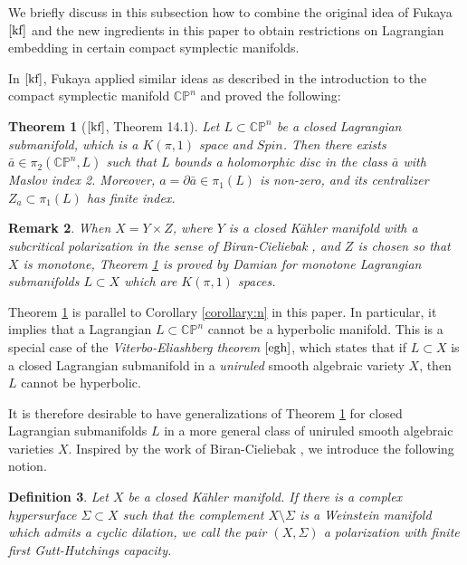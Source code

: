 \documentclass[a4paper]{article}
\newtheorem{theorem}{Theorem}
\newtheorem{definition}[theorem]{Definition}
\newtheorem{remark}[theorem]{Remark}
\numberwithin{equation}{section}
\begin{document}
We briefly discuss in this subsection how to combine the original idea of Fukaya $\cite{kf}$ and the new ingredients in this paper to obtain restrictions on Lagrangian embedding in certain compact symplectic manifolds.

In $\cite{kf}$, Fukaya applied similar ideas as described in the introduction to the compact symplectic manifold $\mathbb{CP}^n$ and proved the following:

\begin{theorem}[$\cite{kf}$, Theorem 14.1]\label{theorem:compact}
Let $L\subset\mathbb{CP}^n$ be a closed Lagrangian submanifold, which is a $K(\pi,1)$ space and $\mathit{Spin}$. Then there exists $\bar{a}\in\pi_2(\mathbb{CP}^n,L)$ such that $L$ bounds a holomorphic disc in the class $\bar{a}$ with Maslov index 2. Moreover, $a=\partial\bar{a}\in\pi_1(L)$ is non-zero, and its centralizer $Z_a\subset\pi_1(L)$ has finite index.
\end{theorem}

\begin{remark}\label{remark:Damian}
When $X=Y\times Z$, where $Y$ is a closed K\"{a}hler manifold with a subcritical polarization in the sense of Biran-Cieliebak \cite{bc}, and $Z$ is chosen so that $X$ is monotone, Theorem \ref{theorem:compact} is proved by Damian \cite{md} for monotone Lagrangian submanifolds $L\subset X$ which are $K(\pi,1)$ spaces.
\end{remark}

Theorem \ref{theorem:compact} is parallel to Corollary \ref{corollary:n} in this paper. In particular, it implies that a Lagrangian $L\subset\mathbb{CP}^n$ cannot be a hyperbolic manifold. This is a special case of the \textit{Viterbo-Eliashberg theorem} $\cite{egh}$, which states that if $L\subset X$ is a closed Lagrangian submanifold in a \textit{uniruled} smooth algebraic variety $X$, then $L$ cannot be hyperbolic.

It is therefore desirable to have generalizations of Theorem \ref{theorem:compact} for closed Lagrangian submanifolds $L$ in a more general class of uniruled smooth algebraic varieties $X$. Inspired by the work of Biran-Cieliebak \cite{bc}, we introduce the following notion.

\begin{definition}
Let $X$ be a closed K\"{a}hler manifold. If there is a complex hypersurface $\Sigma\subset X$ such that the complement $X\setminus\Sigma$ is a Weinstein manifold which admits a cyclic dilation, we call the pair $(X,\Sigma)$ a polarization with finite first Gutt-Hutchings capacity.
\end{definition}
\end{document}
